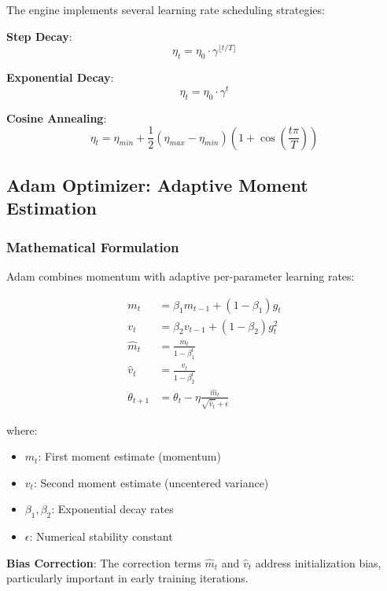 \documentclass[11pt,a4paper]{report}
\begin{document}
The engine implements several learning rate scheduling strategies:

\textbf{Step Decay}:
\begin{equation}
\eta_t = \eta_0 \cdot \gamma^{\lfloor t/T \rfloor}
\end{equation}

\textbf{Exponential Decay}:
\begin{equation}
\eta_t = \eta_0 \cdot \gamma^t
\end{equation}

\textbf{Cosine Annealing}:
\begin{equation}
\eta_t = \eta_{min} + \frac{1}{2}(\eta_{max} - \eta_{min})\left(1 + \cos\left(\frac{t\pi}{T}\right)\right)
\end{equation}

\subsection{Adam Optimizer: Adaptive Moment Estimation}

\subsubsection{Mathematical Formulation}

Adam combines momentum with adaptive per-parameter learning rates:

\begin{align}
m_t &= \beta_1 m_{t-1} + (1 - \beta_1) g_t \\
v_t &= \beta_2 v_{t-1} + (1 - \beta_2) g_t^2 \\
\hat{m}_t &= \frac{m_t}{1 - \beta_1^t} \\
\hat{v}_t &= \frac{v_t}{1 - \beta_2^t} \\
\theta_{t+1} &= \theta_t - \eta \frac{\hat{m}_t}{\sqrt{\hat{v}_t} + \epsilon}
\end{align}

where:
\begin{itemize}
\item $m_t$: First moment estimate (momentum)
\item $v_t$: Second moment estimate (uncentered variance)
\item $\beta_1, \beta_2$: Exponential decay rates
\item $\epsilon$: Numerical stability constant
\end{itemize}

\textbf{Bias Correction}: The correction terms $\hat{m}_t$ and $\hat{v}_t$ address initialization bias, particularly important in early training iterations.
\end{document}
